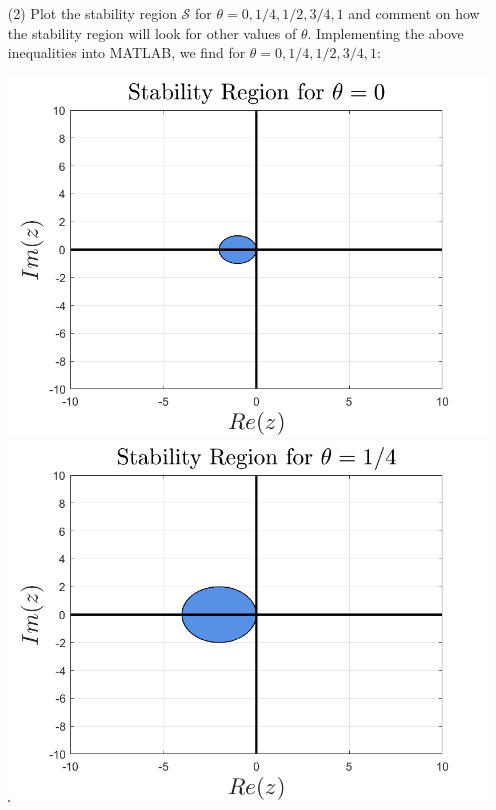 \documentclass{article}
\begin{document}
\begin{itemize}
    \item[(2)] Plot the stability region $\mathcal{S}$ for $\theta = 0, 1/4, 1/2, 3/4, 1$ and comment on how the stability region will look for other values of $\theta$.
    \newline\newline
    Implementing the above inequalities into MATLAB, we find for $\theta = 0, 1/4, 1/2, 3/4, 1$:
    \begin{center}
        \includegraphics[scale = 0.25]{stabilityregion0.png}
        \includegraphics[scale = 0.25]{stabilityregion0.25.png}
        \newline

\end{center}
\end{itemize}
\end{document}
